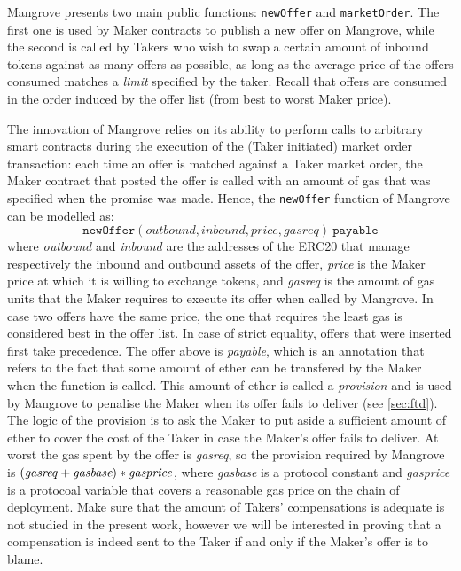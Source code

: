 \documentclass[12pt]{extarticle}
\begin{document}
Mangrove presents two main public functions: \texttt{newOffer} and \texttt{marketOrder}. The first one is used by Maker contracts to publish a new offer on Mangrove, while the second is called by Takers who wish to swap a certain amount of inbound tokens against as many offers as possible, as long as the average price of the offers consumed matches a \emph{limit} specified by the taker. Recall that offers are consumed in the order induced by the offer list (from best to worst Maker price).

The innovation of Mangrove relies on its ability to perform calls to arbitrary smart contracts during the execution of the (Taker initiated) market order transaction: each time an offer is matched against a Taker market order, the Maker contract that posted the offer is called with an amount of gas that was specified  when the promise was made. Hence, the \texttt{newOffer} function of Mangrove can be modelled as:
$$
\mathtt{newOffer}(\mathit{outbound}, \mathit{inbound}, \mathit{price}, \mathit{gasreq})\ \mathtt{payable}
$$
where \emph{outbound} and \emph{inbound} are the addresses of the ERC20 that manage respectively the inbound and outbound assets of the offer, \emph{price} is the Maker price at which it is willing to exchange tokens, and \emph{gasreq} is the amount of gas units that the Maker requires to execute its offer when called by Mangrove. In case two offers have the same price, the one that requires the least gas is considered best in the offer list. In case of strict equality, offers that were inserted first take precedence. The offer above is \emph{payable}, which is an annotation that refers to the fact that some amount of ether can be transfered by the Maker when the function is called. This amount of ether is called a \emph{provision} and is used by Mangrove to penalise the Maker when its offer fails to deliver (see \autoref{sec:ftd}). The logic of the provision is to ask the Maker to put aside a sufficient amount of ether to cover the cost of the Taker in case the Maker's offer fails to deliver. At worst the gas spent by the offer is \emph{gasreq}, so the provision required by Mangrove is $(\mathit{gasreq}+\emph{gasbase})*\mathit{gasprice}$, where \emph{gasbase} is a protocol constant and \emph{gasprice} is a protocoal variable that covers a reasonable gas price on the chain of deployment. Make sure that the amount of Takers' compensations is adequate is not studied in the present work, however we will be interested in proving that a compensation is indeed sent to the Taker if and only if the Maker's offer is to blame.
\end{document}
